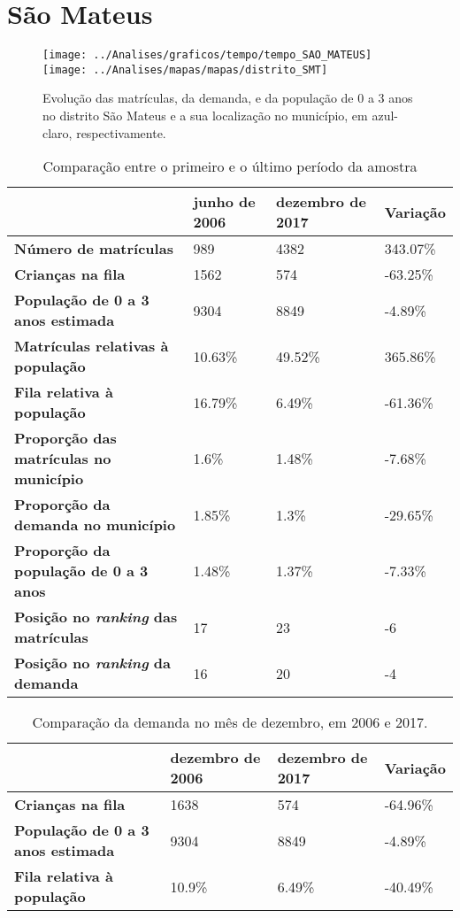 \section{São Mateus}
\begin{figure}[H]
\centering
\texttt{[image: ../Analises/graficos/tempo/tempo\_SAO\_MATEUS]}
\texttt{[image: ../Analises/mapas/mapas/distrito\_SMT]}
\caption{Evolução das matrículas, da demanda, e da população de 0 a 3 anos no distrito São Mateus e a sua localização no município, em azul-claro, respectivamente.}
\end{figure}
\begin{table}[H]
\begin{tabular}{l|l|l|l}
\textbf{}                                      & \textbf{junho de 2006}       & \textbf{dezembro de 2017}    & \textbf{Variação} \\ \hline
\textbf{Número de matrículas}                  & 989 & 4382 & 343.07\% \\ \hline
\textbf{Crianças na fila}                      & 1562 & 574 & -63.25\% \\ \hline
\textbf{População de 0 a 3 anos estimada}      & 9304 & 8849 & -4.89\% \\ \hline
\textbf{Matrículas relativas à população}      & 10.63\% & 49.52\% & 365.86\% \\ \hline
\textbf{Fila relativa à população}             & 16.79\% & 6.49\% & -61.36\% \\ \hline
\textbf{Proporção das matrículas no município} & 1.6\% & 1.48\% & -7.68\% \\ \hline
\textbf{Proporção da demanda no município}     & 1.85\% & 1.3\% & -29.65\% \\ \hline
\textbf{Proporção da população de 0 a 3 anos}  & 1.48\% & 1.37\% & -7.33\% \\ \hline
\textbf{Posição no \textit{ranking} das matrículas}     & 17 & 23 & -6 \\ \hline
\textbf{Posição no \textit{ranking} da demanda}         & 16 & 20 & -4 \\ 
\end{tabular}
\caption{Comparação entre o primeiro e o último período da amostra}
\end{table}
\begin{table}[H]
\begin{tabular}{l|l|l|l}
\textbf{}                                 & \textbf{dezembro de 2006} & \textbf{dezembro de 2017} & \textbf{Variação} \\ \hline
\textbf{Crianças na fila}                      & 1638 & 574 & -64.96\% \\ \hline
\textbf{População de 0 a 3 anos estimada}      & 9304 & 8849 & -4.89\% \\ \hline
\textbf{Fila relativa à população}             & 10.9\% & 6.49\% & -40.49\% \\
\end{tabular}
\caption{Comparação da demanda no mês de dezembro, em 2006 e 2017.}
\end{table}
